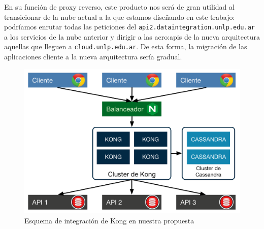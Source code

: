 En su función de proxy reverso, este producto nos será de gran utilidad al transicionar de la nube actual a la que estamos diseñando en este trabajo: podríamos enrutar todas las peticiones del  \texttt{api2.dataintegration.unlp.edu.ar} a los servicios de la nube anterior y dirigir a las \glspl{acro:api} de la nueva arquitectura aquellas que lleguen a \texttt{cloud.unlp.edu.ar}. De esta forma, la migración de las aplicaciones cliente a la nueva arquitectura sería gradual.

\begin{figure}[H]
  \includegraphics[width=\linewidth]{src/images/03-capitulo-3/tecnologias/kong/kong-integracion-arquitectura.png}
  \caption{Esquema de integración de Kong en nuestra propuesta}
  \label{fig:integracion-kong-arquitectura}
\end{figure}
